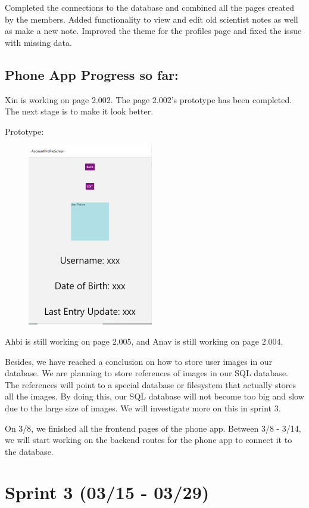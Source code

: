 \documentclass[]{book}
\begin{document}
Completed the connections to the database and combined all the pages
created by the members. Added functionality to view and edit old
scientist notes as well as make a new note. Improved the theme for the
profiles page and fixed the issue with missing data.

\subsection{Phone App Progress so far:}\label{phone-app-progress-so-far}

Xin is working on page 2.002. The page 2.002's prototype has been
completed. The next stage is to make it look better.

Prototype:

\begin{figure}
\centering
\includegraphics{images/mobile_prototype.png}
\caption{}
\end{figure}

Ahbi is still working on page 2.005, and Anav is still working on page
2.004.

Besides, we have reached a conclusion on how to store user images in our
database. We are planning to store references of images in our SQL
database. The references will point to a special database or filesystem
that actually stores all the images. By doing this, our SQL database
will not become too big and slow due to the large size of images. We
will investigate more on this in sprint 3.

On 3/8, we finished all the frontend pages of the phone app. Between 3/8
- 3/14, we will start working on the backend routes for the phone app to
connect it to the database.

\section{Sprint 3 (03/15 - 03/29)}\label{sprint-3-0315---0329}
\end{document}
